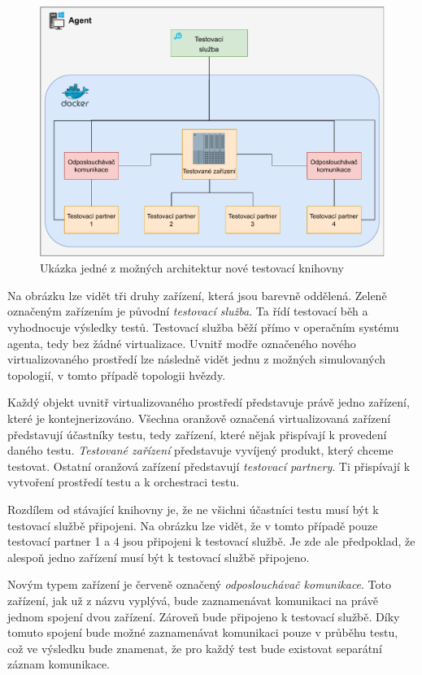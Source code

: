 \begin{figure}[htbp]
    \centering 
    \includegraphics[width=\textwidth]{assets/img/architecture.pdf}
    \caption{Ukázka jedné z možných architektur nové testovací knihovny}
    \label{fig:architecture}
\end{figure}

Na obrázku lze vidět tři druhy zařízení, která jsou barevně oddělená. Zeleně označeným zařízením je původní \textit{testovací služba}. Ta řídí testovací běh a vyhodnocuje výsledky testů. Testovací služba běží přímo v operačním systému agenta, tedy bez žádné virtualizace. Uvnitř modře označeného nového virtualizovaného prostředí lze následně vidět jednu z možných simulovaných topologií, v tomto případě topologii hvězdy. 

Každý objekt uvnitř virtualizovaného prostředí představuje právě jedno zařízení, které je kontejnerizováno. Všechna oranžově označená virtualizovaná zařízení představují účastníky testu, tedy zařízení, které nějak přispívají k provedení daného testu. \textit{Testované zařízení} představuje vyvíjený produkt, který chceme testovat. Ostatní oranžová zařízení představují \textit{testovací partnery}. Ti přispívají k vytvoření prostředí testu a k orchestraci testu.

Rozdílem od stávající knihovny je, že ne všichni účastníci testu musí být k testovací službě připojeni. Na obrázku lze vidět, že v tomto případě pouze testovací partner 1 a 4 jsou připojeni k testovací službě. Je zde ale předpoklad, že alespoň jedno zařízení musí být k testovací službě připojeno.

Novým typem zařízení je červeně označený \textit{odposlouchávač komunikace}. Toto zařízení, jak už z názvu vyplývá, bude zaznamenávat komunikaci na právě jednom spojení dvou zařízení. Zároveň bude připojeno k testovací službě. Díky tomuto spojení bude možné zaznamenávat komunikaci pouze v průběhu testu, což ve výsledku bude znamenat, že pro každý test bude existovat separátní záznam komunikace.

